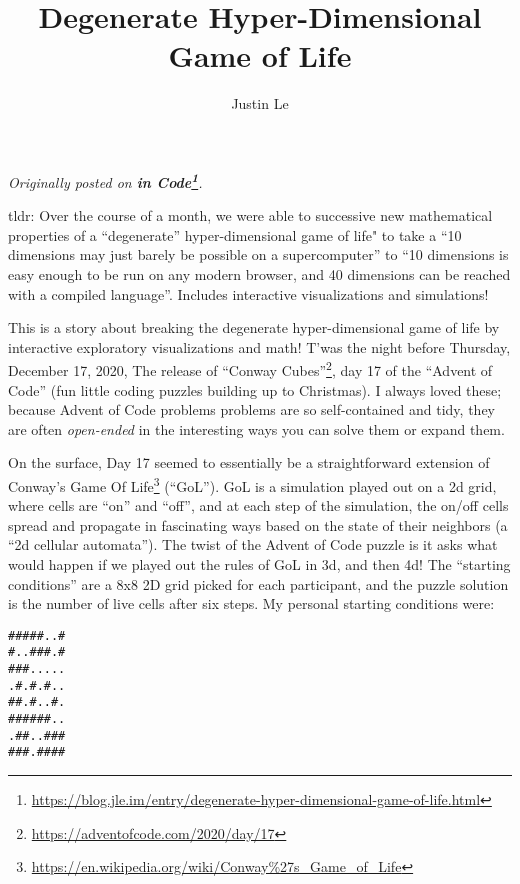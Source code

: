 \documentclass[]{article}
\title{Degenerate Hyper-Dimensional Game of Life}
\author{Justin Le}
\renewcommand{\href}[2]{#2\footnote{\url{#1}}}
\begin{document}
\maketitle

\emph{Originally posted on
\textbf{\href{https://blog.jle.im/entry/degenerate-hyper-dimensional-game-of-life.html}{in
Code}}.}

tldr: Over the course of a month, we were able to successive new mathematical
properties of a ``degenerate'' hyper-dimensional game of life" to take a ``10
dimensions may just barely be possible on a supercomputer'' to ``10 dimensions
is easy enough to be run on any modern browser, and 40 dimensions can be reached
with a compiled language''. Includes interactive visualizations and simulations!

This is a story about breaking the degenerate hyper-dimensional game of life by
interactive exploratory visualizations and math! T'was the night before
Thursday, December 17, 2020, The release of
\href{https://adventofcode.com/2020/day/17}{``Conway Cubes''}, day 17 of the
``Advent of Code'' (fun little coding puzzles building up to Christmas). I
always loved these; because Advent of Code problems problems are so
self-contained and tidy, they are often \emph{open-ended} in the interesting
ways you can solve them or expand them.

On the surface, Day 17 seemed to essentially be a straightforward extension of
\href{https://en.wikipedia.org/wiki/Conway\%27s_Game_of_Life}{Conway's Game Of
Life} (``GoL''). GoL is a simulation played out on a 2d grid, where cells are
``on'' and ``off'', and at each step of the simulation, the on/off cells spread
and propagate in fascinating ways based on the state of their neighbors (a ``2d
cellular automata''). The twist of the Advent of Code puzzle is it asks what
would happen if we played out the rules of GoL in 3d, and then 4d! The
``starting conditions'' are a 8x8 2D grid picked for each participant, and the
puzzle solution is the number of live cells after six steps. My personal
starting conditions were:

\begin{verbatim}
#####..#
#..###.#
###.....
.#.#.#..
##.#..#.
######..
.##..###
###.####
\end{verbatim}
\end{document}
